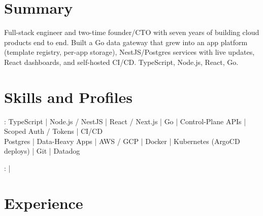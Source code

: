 \documentclass[print]{jack-resume}
\begin{document}
\pagecolor{darkmodeBackground}


\begin{minipage}[t][1cm][t]{.03\textwidth}
    \hfill
\end{minipage}

\section{Summary}
Full-stack engineer and two-time founder/CTO with seven years of building cloud products end to end. Built a Go data gateway that grew into an app platform (template registry, per-app storage), NestJS/Postgres services with live updates, React dashboards, and self-hosted CI/CD. TypeScript, Node.js, React, Go.
\sectionsep

\section{Skills and Profiles}
:
TypeScript \hfill | \hfill
Node.js / NestJS \hfill | \hfill
React / Next.js \hfill | \hfill
Go \hfill | \hfill
Control-Plane APIs \hfill | \hfill
Scoped Auth / Tokens \hfill | \hfill
CI/CD \\
\hspace{1.0cm} Postgres \hfill | \hfill
Data-Heavy Apps \hfill | \hfill
AWS / GCP \hfill | \hfill
Docker \hfill | \hfill
Kubernetes (ArgoCD deploys) \hfill | \hfill
Git \hfill | \hfill
Datadog \\

\raggedright{
    :
      \href{https://www.linkedin.com/in/jack-sturtevant/}{ \ExternalLink} |
     \href{https://github.com/jacksturt}{ \ExternalLink}}

\section{Experience}
\end{document}

